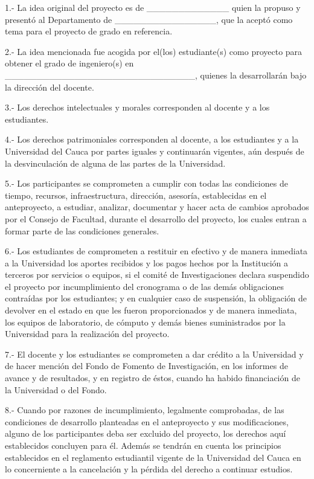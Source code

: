 1.- La idea original del proyecto es de \_\_\_\_\_\_\_\_\_\_\_\_\_ quien la propuso y presentó al Departamento de \_\_\_\_\_\_\_\_\_\_\_\_\_\_\_\_, que la aceptó como tema para el proyecto de grado en referencia.

2.- La idea mencionada fue acogida por el(los)  estudiante(s) como proyecto para obtener el grado de ingeniero(s) en \_\_\_\_\_\_\_\_\_\_\_\_\_\_\_\_\_\_\_\_\_\_\_\_\_\_\_\_\_\_, quienes la desarrollarán bajo la dirección del docente.

3.- Los derechos intelectuales y morales corresponden al docente y a los estudiantes.

4.- Los derechos patrimoniales corresponden al docente, a los estudiantes y a la Universidad del Cauca por partes iguales y continuarán vigentes, aún después de la desvinculación de alguna de las partes de la Universidad.

5.- Los participantes se comprometen a cumplir con todas las condiciones de tiempo, recursos, infraestructura, dirección, asesoría, establecidas en el anteproyecto, a estudiar, analizar, documentar y hacer acta de cambios aprobados por el Consejo de Facultad, durante el desarrollo del proyecto, los cuales entran a formar parte de las condiciones generales.

6.- Los estudiantes de comprometen a restituir en efectivo y de manera inmediata a la Universidad los aportes recibidos y los pagos hechos por la Institución  a terceros por servicios o equipos, si el comité de Investigaciones declara suspendido el proyecto por incumplimiento del cronograma o de las demás obligaciones contraídas por los estudiantes; y en cualquier caso de suspensión, la obligación de devolver en el estado en que les fueron proporcionados y de manera inmediata, los equipos de laboratorio, de cómputo y demás bienes suministrados por la Universidad para la realización del proyecto.

7.- El docente y los estudiantes se comprometen a dar crédito a la Universidad y de hacer mención del Fondo de Fomento de Investigación, en los informes de avance y de resultados, y en registro de éstos, cuando ha habido financiación de la Universidad o del Fondo.

8.- Cuando por razones de incumplimiento, legalmente comprobadas, de las condiciones de desarrollo planteadas en el anteproyecto y sus modificaciones, alguno de los participantes deba ser excluido del proyecto, los derechos aquí establecidos concluyen para él.  Además se tendrán en cuenta los principios establecidos en el reglamento estudiantil vigente de la Universidad del Cauca en lo concerniente a la cancelación y la pérdida del derecho a continuar estudios. 

